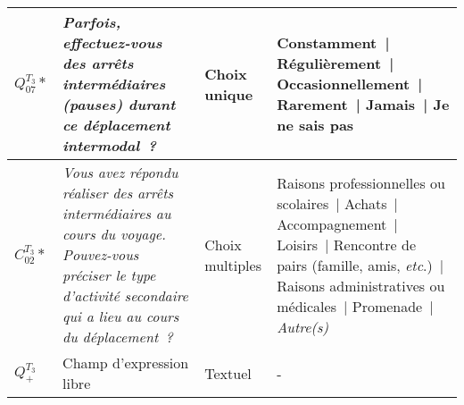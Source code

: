 \begin{table}[h!]
{\begin{tabular}{p{}p{}p{}p{}}
\hline
    \small{\textbf{\(Q_{07}^{T_{3}}*\)}} & \small{\textsl{Parfois, effectuez-vous des arrêts intermédiaires (pauses) durant ce déplacement intermodal~?}} & \small{Choix unique} & \small{Constamment~| Régulièrement~| Occasionnellement~| Rarement~| Jamais~| Je ne sais pas}\\
\hline
    \small{\(C_{02}^{T_{3}}*\)} & \small{\textsl{Vous avez répondu réaliser des arrêts intermédiaires au cours du voyage. Pouvez-vous préciser le type d'activité secondaire qui a lieu au cours du déplacement~?}} & \small{Choix multiples} & \small{Raisons professionnelles ou scolaires~| Achats~| Accompagnement~| Loisirs~| Rencontre de pairs (famille, amis, \textsl{etc}.)~| Raisons administratives ou médicales~| Promenade~| \textsl{Autre(s)}}\\
\hline
    \small{\textbf{\(Q_{+}^{T_{3}}\)}} & \small{Champ d'expression libre} & \small{Textuel} & \small{-}\\
      \hline
    \end{tabular}}
    \caption*{}
    \vspace{5pt}
        \end{table}

